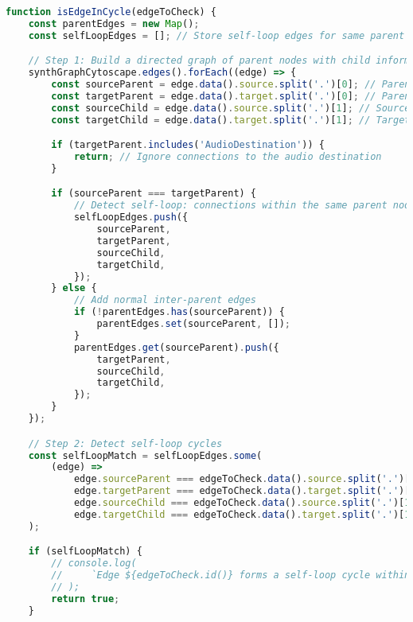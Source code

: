 \begin{lstlisting}[language=JavaScript, caption={Determines whether a given cable (edge) introduces a cycle in the patch graph rendered by Cytoscape. The function checks for both self-loop cycles and inter-node cycles using depth-first search (DFS). If a cycle is detected, it inserts a feedbackDelayNode with a fixed delay of 128 samples into the audio graph to allow feedback patching.}, label={lst:isEdgeInCycle-function}]
function isEdgeInCycle(edgeToCheck) {
    const parentEdges = new Map();
    const selfLoopEdges = []; // Store self-loop edges for same parent connections

    // Step 1: Build a directed graph of parent nodes with child information
    synthGraphCytoscape.edges().forEach((edge) => {
        const sourceParent = edge.data().source.split('.')[0]; // Parent of the source node
        const targetParent = edge.data().target.split('.')[0]; // Parent of the target node
        const sourceChild = edge.data().source.split('.')[1]; // Source child
        const targetChild = edge.data().target.split('.')[1]; // Target child

        if (targetParent.includes('AudioDestination')) {
            return; // Ignore connections to the audio destination
        }

        if (sourceParent === targetParent) {
            // Detect self-loop: connections within the same parent node
            selfLoopEdges.push({
                sourceParent,
                targetParent,
                sourceChild,
                targetChild,
            });
        } else {
            // Add normal inter-parent edges
            if (!parentEdges.has(sourceParent)) {
                parentEdges.set(sourceParent, []);
            }
            parentEdges.get(sourceParent).push({
                targetParent,
                sourceChild,
                targetChild,
            });
        }
    });

    // Step 2: Detect self-loop cycles
    const selfLoopMatch = selfLoopEdges.some(
        (edge) =>
            edge.sourceParent === edgeToCheck.data().source.split('.')[0] &&
            edge.targetParent === edgeToCheck.data().target.split('.')[0] &&
            edge.sourceChild === edgeToCheck.data().source.split('.')[1] &&
            edge.targetChild === edgeToCheck.data().target.split('.')[1]
    );

    if (selfLoopMatch) {
        // console.log(
        //     `Edge ${edgeToCheck.id()} forms a self-loop cycle within ${edgeToCheck.data().source.split('.')[0]}`
        // );
        return true;
    }


\end{lstlisting}
